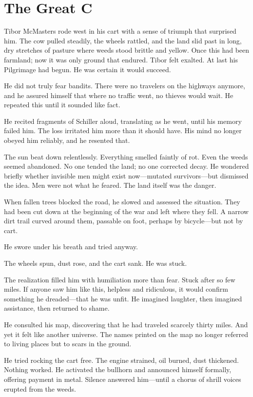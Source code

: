 \chapter{The Great C}

Tibor McMasters rode west in his cart with a sense of triumph that surprised him. The cow pulled steadily, the wheels rattled, and the land slid past in long, dry stretches of pasture where weeds stood brittle and yellow. Once this had been farmland; now it was only ground that endured. Tibor felt exalted. At last his Pilgrimage had begun. He was certain it would succeed.

He did not truly fear bandits. There were no travelers on the highways anymore, and he assured himself that where no traffic went, no thieves would wait. He repeated this until it sounded like fact.

He recited fragments of Schiller aloud, translating as he went, until his memory failed him. The loss irritated him more than it should have. His mind no longer obeyed him reliably, and he resented that.

The sun beat down relentlessly. Everything smelled faintly of rot. Even the weeds seemed abandoned. No one tended the land; no one corrected decay. He wondered briefly whether invisible men might exist now—mutated survivors—but dismissed the idea. Men were not what he feared. The land itself was the danger.

When fallen trees blocked the road, he slowed and assessed the situation. They had been cut down at the beginning of the war and left where they fell. A narrow dirt trail curved around them, passable on foot, perhaps by bicycle—but not by cart.

He swore under his breath and tried anyway.

The wheels spun, dust rose, and the cart sank. He was stuck.

The realization filled him with humiliation more than fear. Stuck after so few miles. If anyone saw him like this, helpless and ridiculous, it would confirm something he dreaded—that he was unfit. He imagined laughter, then imagined assistance, then returned to shame.

He consulted his map, discovering that he had traveled scarcely thirty miles. And yet it felt like another universe. The names printed on the map no longer referred to living places but to scars in the ground.

He tried rocking the cart free. The engine strained, oil burned, dust thickened. Nothing worked. He activated the bullhorn and announced himself formally, offering payment in metal. Silence answered him—until a chorus of shrill voices erupted from the weeds.

